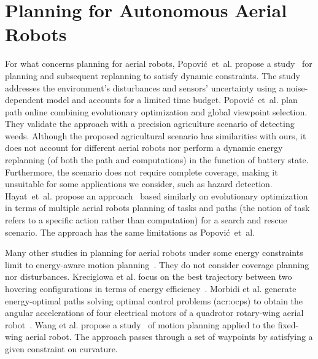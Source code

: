 \section{Planning for Autonomous Aerial Robots}
\label{sec:soa-aerial-pl}

For what concerns planning for aerial robots, Popovi\'{c}~et~al. propose a study~\citep{popovic2017online} for planning and subsequent replanning to satisfy dynamic constraints. The study addresses the environment's disturbances and sensors' uncertainty using a noise-dependent model and accounts for a limited time budget. Popovi\'{c}~et~al. plan path online combining evolutionary optimization and global viewpoint selection. They validate the approach with a precision agriculture scenario of detecting weeds. Although the proposed agricultural scenario has similarities with ours, it does not account for different aerial robots nor perform a dynamic energy replanning (of both the path and computations) in the function of battery state. Furthermore, the scenario does not require complete coverage, making it unsuitable for some applications we consider, such as hazard detection. Hayat~et~al. propose an approach~\citep{hayat2017multi} based similarly on evolutionary optimization in terms of multiple aerial robots planning of tasks and paths (the notion of task refers to a specific action rather than computation) for a search and rescue scenario. The approach has the same limitations as Popovi\'{c}~et~al.

Many other studies in planning for aerial robots under some energy constraints limit to energy-aware motion planning~\citep{wang2017curvature,morbidi2016minimum,kreciglowa2017energy}. They do not consider coverage planning nor disturbances. Kreciglowa et al. focus on the best trajectory between two hovering configurations in terms of energy efficiency~\citep{kreciglowa2017energy}. Morbidi et al. generate energy-optimal paths solving optimal control problems (\Gls{acr:ocp}s) to obtain the angular accelerations of four electrical motors of a quadrotor rotary-wing aerial robot~\citep{morbidi2016minimum}. 
Wang et al. propose a study~\citep{wang2017curvature}  of motion planning applied to the fixed-wing aerial robot. The approach passes through a set of waypoints by satisfying a given constraint on curvature.

